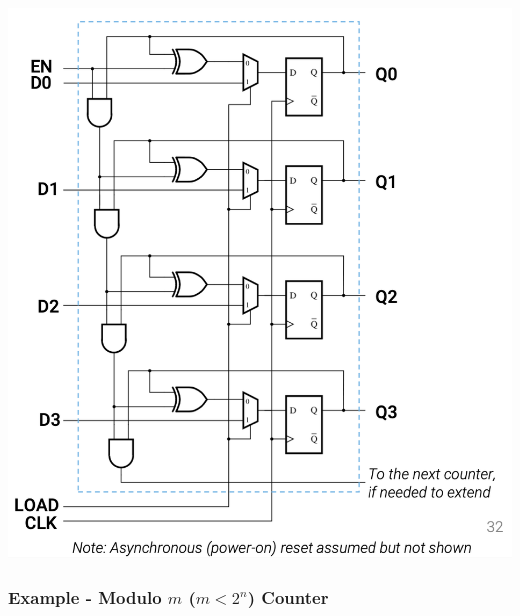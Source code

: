 \documentclass[12pt,openany]{book}
\begin{document}
\begin{minipage}{0.45\textwidth}
	\centering
	\includegraphics[width=1.0\textwidth]{circuits/14.5_3.png} %
\end{minipage}


\subsubsection{Example - Modulo \(m \) (\(m < 2^n\)) Counter}
\end{document}
